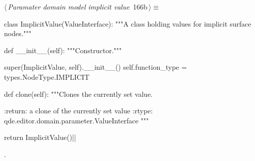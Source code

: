 \documentclass[%
    a4paper,    %
    justified,  %
    nobib,      %
    openany     %
]{tufte-book}
\begin{document}
\begin{flushleft} \small
\begin{minipage}{\linewidth}\label{scrap186}\raggedright\small
{} $\langle\,${\itshape Paramater domain model implicit value}\nobreak\ {\footnotesize {166b}}$\,\rangle\equiv$
\vspace{-1ex}
\begin{pythoncode}
class ImplicitValue(ValueInterface):
    """A class holding values for implicit surface nodes."""

    def __init__(self):
        """Constructor."""

        super(ImplicitValue, self).__init__()
        self.function_type = types.NodeType.IMPLICIT

    def clone(self):
        """Clones the currently set value.

        :return: a clone of the currently set value
        :rtype:  qde.editor.domain.parameter.ValueInterface
        """

        return ImplicitValue()|\NWsep|
\end{pythoncode}
\vspace{1.5ex}
\footnotesize
\begin{list}{}{\setlength{\itemsep}{-\parsep}\setlength{\itemindent}{-\leftmargin}}
\item {\NWtxtMacroNoRef}.

\item{}
\end{list}
\end{minipage}\vspace{4ex}
\end{flushleft}
\end{document}
